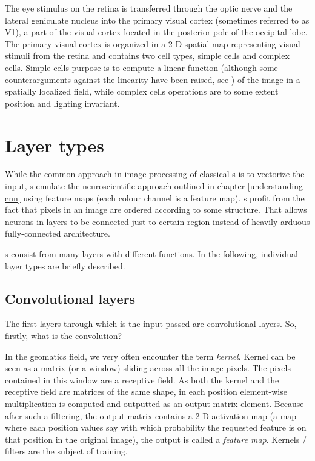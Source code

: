 The eye stimulus on the retina is transferred through the optic nerve and the 
lateral geniculate nucleus into the primary visual cortex (sometimes referred to 
as V1), a part of the visual cortex located in the posterior pole of the 
occipital lobe. The primary visual cortex is organized in a 2-D spatial map 
representing visual stimuli from the retina and contains two cell types, simple 
cells and complex cells. Simple cells purpose is to compute a linear function 
(although some counterarguments against the linearity have been raised, see 
\cite{simple-cells}) of the image in a spatially localized field, while complex 
cells operations are to some extent position and lighting invariant. 

\section{Layer types}
\label{layers}

While the common approach in image processing of classical s is to 
vectorize the input, s emulate the neuroscientific approach outlined in 
chapter \ref{understanding-cnn} using feature maps (each colour channel is a 
feature map). s profit from the fact that pixels in an image are ordered 
according to some structure. That allows neurons in layers to be connected just 
to certain region instead of heavily arduous fully-connected architecture. 

s consist from many layers with different functions. In the following, 
individual layer types are briefly described. 

\subsection{Convolutional layers}
\label{conv-layers}

The first layers through which is the input passed are convolutional layers. So, 
firstly, what is the convolution? 

In the geomatics field, we very often encounter the term \textit{kernel}. Kernel 
can be seen as a matrix (or a window) sliding across all the image pixels. The 
pixels contained in this window are a receptive field. As both the kernel and 
the receptive field are matrices of the same shape, in each position element-wise
multiplication is computed and outputted as an output matrix element. 
Because after such a filtering, the output matrix contains a 2-D activation map 
(a map where each position values say with which probability the requested 
feature is on that position in the original image), the output is called a 
\textit{feature map}. Kernels / filters are the subject of training. 

